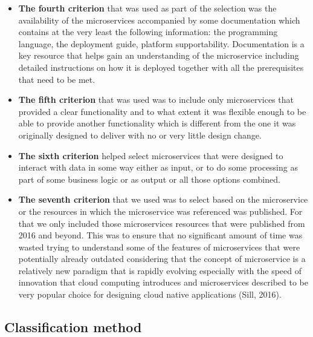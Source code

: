 \documentclass{article}
\begin{document}
\begin{itemize}
\item \textbf{The fourth criterion} that was used as part of the selection was the availability of the microservices accompanied by some documentation which contains at the very least the following information: the programming language, the deployment guide, platform supportability. Documentation is a key resource that helps gain an understanding of the microservice including detailed instructions on how it is deployed together with all the prerequisites that need to be met.

\item \textbf{The fifth criterion} that was used was to include only microservices that provided a clear functionality and to what extent it was flexible enough to be able to provide another functionality which is different from the one it was originally designed to deliver with no or very little design change.


\item \textbf{The sixth criterion} helped select microservices that were designed to interact with data in some way either as input, or to do some processing as part of some business logic or as output or all those options combined.


\item \textbf{The seventh criterion} that we used was to select based on the microservice or the resources in which the microservice was referenced was published. For that we only included those microservices resources that were published from 2016 and beyond. This was to ensure that no significant amount of time was wasted trying to understand some of the features of microservices that were potentially already outdated considering that the concept of microservice is a relatively new paradigm that is rapidly evolving especially with the speed of innovation that cloud computing introduces and microservices described to be very popular choice for designing cloud native applications (Sill, 2016). 

\end{itemize}

\subsection{Classification method}
\end{document}
